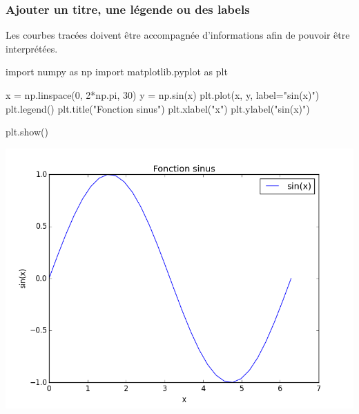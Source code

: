 \begin{frame}[fragile]
\frametitle{Ajouter un titre, une légende ou des labels}

Les courbes tracées doivent être accompagnée d'informations afin de pouvoir être interprétées.

\begin{minipage}{0.5\linewidth}
\begin{GrayBox}[0.85\textwidth]
\begin{verbatimtab}[3]
import numpy as np
import matplotlib.pyplot as plt

x = np.linspace(0, 2*np.pi, 30)
y = np.sin(x)
plt.plot(x, y, label="sin(x)")
plt.legend()
plt.title("Fonction sinus")
plt.xlabel("x")
plt.ylabel("sin(x)")

plt.show()
\end{verbatimtab}
\end{GrayBox}
\end{minipage}\hfill
\begin{minipage}{0.46\linewidth}
\begin{center}
 \includegraphics[width=0.9\linewidth]{img/courbe3}
\end{center}
\end{minipage}

\end{frame}

